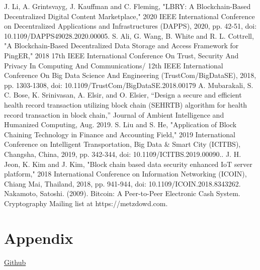 \documentclass[conference]{IEEEtran}
\begin{document}
\begin{thebibliography}{00}
 J. Li, A. Grintsvayg, J. Kauffman and C. Fleming, "LBRY: A Blockchain-Based Decentralized Digital Content Marketplace," 2020 IEEE International Conference on Decentralized Applications and Infrastructures (DAPPS), 2020, pp. 42-51, doi: 10.1109/DAPPS49028.2020.00005.
 S. Ali, G. Wang, B. White and R. L. Cottrell, "A Blockchain-Based Decentralized Data Storage and Access Framework for PingER," 2018 17th IEEE International Conference On Trust, Security And Privacy In Computing And Communications/ 12th IEEE International Conference On Big Data Science And Engineering (TrustCom/BigDataSE), 2018, pp. 1303-1308, doi: 10.1109/TrustCom/BigDataSE.2018.00179
 A. Mubarakali, S. C. Bose, K. Srinivasan, A. Elsir, and O. Elsier, “Design a secure and efficient health record transaction utilizing block chain (SEHRTB) algorithm for health record transaction in block chain,” Journal of Ambient Intelligence and Humanized Computing, Aug. 2019.
 S. Liu and S. He, "Application of Block Chaining Technology in Finance and Accounting Field," 2019 International Conference on Intelligent Transportation, Big Data \& Smart City (ICITBS), Changsha, China, 2019, pp. 342-344, doi: 10.1109/ICITBS.2019.00090..
 J. H. Jeon, K. Kim and J. Kim, "Block chain based data security enhanced IoT server platform," 2018 International Conference on Information Networking (ICOIN), Chiang Mai, Thailand, 2018, pp. 941-944, doi: 10.1109/ICOIN.2018.8343262.
 Nakamoto, Satoshi. (2009). Bitcoin: A Peer-to-Peer Electronic Cash System. Cryptography Mailing list at https://metzdowd.com. 
\end{thebibliography}
\section{Appendix}
\href{https://github.com/ABHIRAMSHIBU/BlockChainDataStore}{Github}
\end{document}
